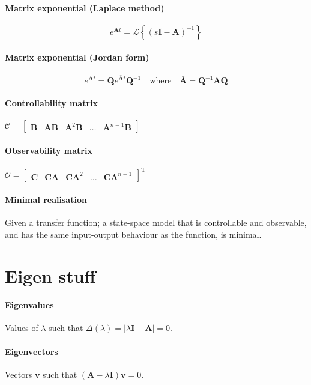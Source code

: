 \documentclass[a4paper]{article}
\newcommand{\M}[1]{\bm{#1}}
\newcommand{\Mc}[1]{\mathbf{#1}}
\newcommand{\V}[1]{\mathbf{#1}}
\newcommand{\lagrange}{\mathscr{L}}
\begin{document}
\paragraph{Matrix exponential (Laplace method)}
$$e^{\M{A}t} = \lagrange \left\{ (s\Mc{I}-\M{A})^{-1} \right\}$$
\paragraph{Matrix exponential (Jordan form)}
$$e^{\M{A}t} = \M{Q} e^{\bar{\M{A}}t} \M{Q}^{-1} \quad \text{where} \quad \bar{\M{A}} = \M{Q}^{-1}\M{AQ}$$
\paragraph{Controllability matrix} $\mathcal{C} = \begin{bmatrix}\M{B} & \M{AB} & \M{A}^{2}\M{B} & \hdots & \M{A}^{n-1}\M{B}\end{bmatrix}$
\paragraph{Observability matrix} $\mathcal{O} = \begin{bmatrix}\M{C} & \M{CA} & \M{CA}^2 & \hdots & \M{CA}^{n-1}\end{bmatrix}^{\text{T}}$
\paragraph{Minimal realisation} Given a transfer function; a state-space model that is controllable and observable, and has the same input-output behaviour as the function, is minimal.



\section{Eigen stuff}
\paragraph{Eigenvalues} Values of $\lambda$ such that $\Delta(\lambda) = |\lambda \M{I} - \M{A}| = 0$.
\paragraph{Eigenvectors} Vectors $\V{v}$ such that $(\M{A} - \lambda \Mc{I})\V{v} = 0$.
\end{document}
